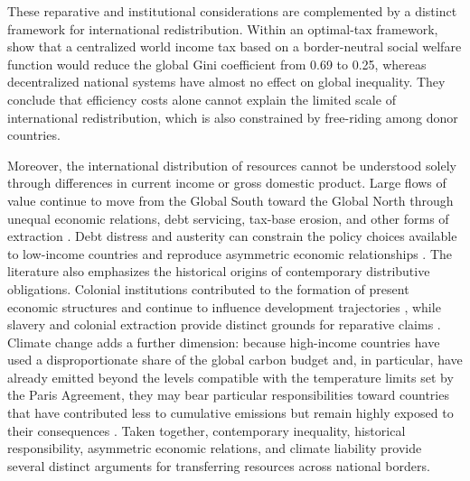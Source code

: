 These reparative and institutional considerations are complemented by a distinct framework for international redistribution. Within an optimal-tax framework, \citet{kopczuk_limitations_2005} show that a centralized world income tax based on a border-neutral social welfare function would reduce the global Gini coefficient from 0.69 to 0.25, whereas decentralized national systems have almost no effect on global inequality. They conclude that efficiency costs alone cannot explain the limited scale of international redistribution, which is also constrained by free-riding among donor countries.

Moreover, the international distribution of resources cannot be understood solely through differences in current income or gross domestic product. Large flows of value continue to move from the Global South toward the Global North through unequal economic relations, debt servicing, tax-base erosion, and other forms of extraction \citep{hickel_plunder_2021}. Debt distress and austerity can constrain the policy choices available to low-income countries and reproduce asymmetric economic relationships \citep{fischer_return_2023}. The literature also emphasizes the historical origins of contemporary distributive obligations. Colonial institutions contributed to the formation of present economic structures and continue to influence development trajectories \citep{bhambra_colonial_2021}, while slavery and colonial extraction provide distinct grounds for reparative claims \citep{solbiac_britains_2015,darity_cumulative_2022}. Climate change adds a further dimension: because high-income countries have used a disproportionate share of the global carbon budget and, in particular, have already emitted beyond the levels compatible with the temperature limits set by the Paris Agreement, they may bear particular responsibilities toward countries that have contributed less to cumulative emissions but remain highly exposed to their consequences \citep{fanning_compensation_2023,Hickel_and_Zoomkawala_2026}. Taken together, contemporary inequality, historical responsibility, asymmetric economic relations, and climate liability provide several distinct arguments for transferring resources across national borders.

